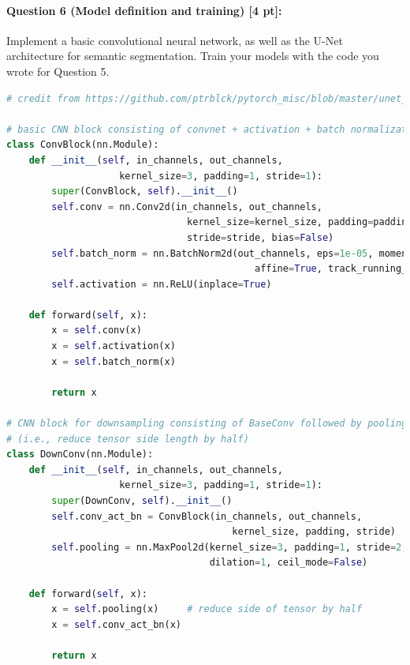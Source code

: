 \documentclass[11pt]{article}
\begin{document}


\paragraph{Question 6 (Model definition and training) [4 pt]:} 
Implement a basic convolutional neural network, as well as the U-Net architecture for semantic segmentation. Train your models with the code you wrote for Question 5. 

\begin{lstlisting}[language=Python, basicstyle=\scriptsize]
# credit from https://github.com/ptrblck/pytorch_misc/blob/master/unet_demo.py

# basic CNN block consisting of convnet + activation + batch normalization
class ConvBlock(nn.Module):
    def __init__(self, in_channels, out_channels, 
                    kernel_size=3, padding=1, stride=1):
        super(ConvBlock, self).__init__()
        self.conv = nn.Conv2d(in_channels, out_channels, 
                                kernel_size=kernel_size, padding=padding, 
                                stride=stride, bias=False)
        self.batch_norm = nn.BatchNorm2d(out_channels, eps=1e-05, momentum=0.1, 
                                            affine=True, track_running_stats=True)
        self.activation = nn.ReLU(inplace=True)
    
    def forward(self, x):
        x = self.conv(x)
        x = self.activation(x)
        x = self.batch_norm(x)
    
        return x

# CNN block for downsampling consisting of BaseConv followed by pooling 
# (i.e., reduce tensor side length by half)
class DownConv(nn.Module):
    def __init__(self, in_channels, out_channels, 
                    kernel_size=3, padding=1, stride=1):
        super(DownConv, self).__init__()
        self.conv_act_bn = ConvBlock(in_channels, out_channels, 
                                        kernel_size, padding, stride)
        self.pooling = nn.MaxPool2d(kernel_size=3, padding=1, stride=2, 
                                    dilation=1, ceil_mode=False)
        
    def forward(self, x):
        x = self.pooling(x)     # reduce side of tensor by half
        x = self.conv_act_bn(x)   

        return x


\end{lstlisting}
\end{document}
